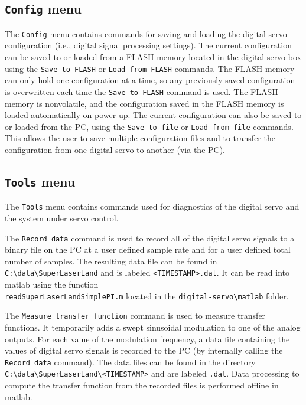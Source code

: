\documentclass[aip,rsi,preprint,graphicx]{revtex4-1}
\begin{document}
\subsection{{\tt Config} menu}

The {\tt Config} menu contains commands for saving and loading the digital servo configuration (i.e., digital signal processing settings).  The current configuration can be saved to or loaded from a FLASH memory located in the digital servo box using the {\tt Save to FLASH} or {\tt Load from FLASH} commands.  The FLASH memory can only hold one configuration at a time, so any previously saved configuration is overwritten each time the {\tt Save to FLASH} command is used.  The FLASH memory is nonvolatile, and the configuration saved in the FLASH memory is loaded automatically on power up.  The current configuration can also be saved to or loaded from the PC, using the {\tt Save to file} or {\tt Load from file} commands.  This allows the user to save multiple configuration files and to transfer the configuration from one digital servo to another (via the PC).

\subsection{{\tt Tools} menu}

The {\tt Tools} menu contains commands used for diagnostics of the digital servo and the system under servo control.

The {\tt Record data} command is used to record all of the digital servo signals to a binary file on the PC at a user defined sample rate and for a user defined total number of samples.  The resulting data file can be found in {\tt C:\textbackslash data\textbackslash SuperLaserLand} and is labeled {\tt <TIMESTAMP>.dat}.  It can be read into matlab using the function \\{\tt readSuperLaserLandSimplePI.m} located in the {\tt digital-servo\textbackslash matlab} folder.

The {\tt Measure transfer function} command is used to measure transfer functions.  It temporarily adds a swept sinusoidal modulation to one of the analog outputs.  For each value of the modulation frequency, a data file containing the values of digital servo signals is recorded to the PC (by internally calling the {\tt Record data} command).  The data files can be found in the directory {\tt C:\textbackslash data\textbackslash SuperLaserLand\textbackslash <TIMESTAMP>} and are labeled {\tt <MODULATION FREQ>.dat}.  Data processing to compute the transfer function from the recorded files is performed offline in matlab.
\end{document}
